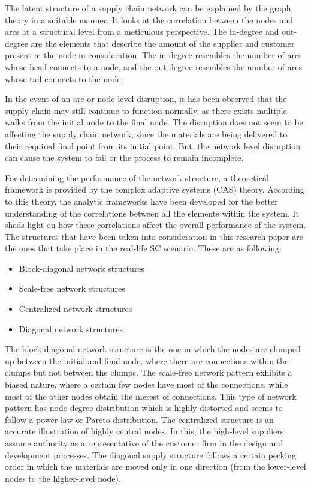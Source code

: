 The latent structure of a supply chain network can be explained by the graph theory in a suitable manner. It looks at the correlation between the nodes and arcs at a structural level from a meticulous perspective. The in-degree and out-degree are the elements that describe the amount of the supplier and customer present in the node in consideration. The in-degree resembles the number of arcs whose head connects to a node, and the out-degree resembles the number of arcs whose tail connects to the node. 

In the event of an arc or node level disruption, it has been observed that the supply chain may still continue to function normally, as there exists multiple walks from the initial node to the final node. The disruption does not seem to be affecting the supply chain network, since the materials are being delivered to their required final point from its initial point. But, the network level disruption can cause the system to fail or the process to remain incomplete.

For determining the performance of the network structure, a theoretical framework is provided by the complex adaptive systems (CAS) theory. According to this theory, the analytic frameworks have been developed for the better understanding of the correlations between all the elements within the system. It sheds light on how these correlations affect the overall performance of the system. The structures that have been taken into consideration in this research paper are the ones that take place in the real-life SC scenario. These are as following:


\begin{itemize}
    \item Block-diagonal network structures
    \item Scale-free network structures
    \item Centralized network structures
    \item Diagonal network structures
\end{itemize}

The block-diagonal network structure is the one in which the nodes are clumped up between the initial and final node, where there are connections within the clumps but not between the clumps. The scale-free network pattern exhibits a biased nature, where a certain few nodes have most of the connections, while most of the other nodes obtain the merest of connections. This type of network pattern has node degree distribution which is highly distorted and seems to follow a power-law or Pareto distribution. The centralized structure is an accurate illustration of highly central nodes. In this, the high-level suppliers assume authority as a representative of the customer firm in the design and development processes. The diagonal supply structure follows a certain pecking order in which the materials are moved only in one direction (from the lower-level nodes to the higher-level node).

